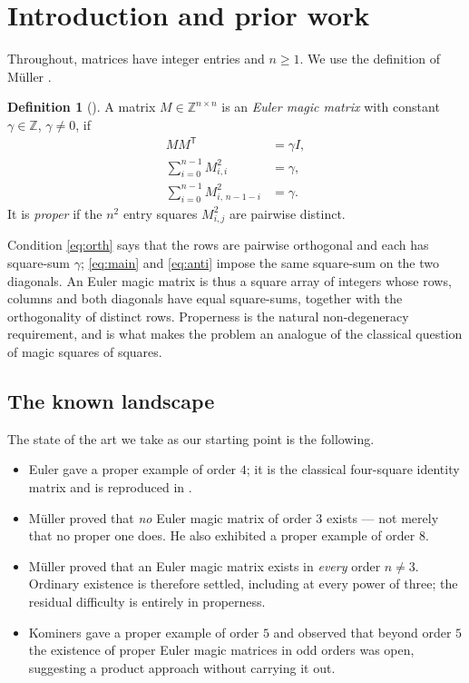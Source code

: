 \documentclass[11pt,a4paper]{amsart}
\theoremstyle{plain}
\theoremstyle{definition}
\newtheorem{definition}[theorem]{Definition}
\theoremstyle{remark}
\newcommand{\ZZ}{\mathbb{Z}}
\newcommand{\tr}{\mathsf{T}}
\begin{document}
\section{Introduction and prior work}

Throughout, matrices have integer entries and $n\ge1$. We use the definition of
Müller \cite{Muller2026}.

\begin{definition}[{\cite[Definition~1.1]{Muller2026}}]\label{def:euler}
A matrix $M\in\ZZ^{n\times n}$ is an \emph{Euler magic matrix} with constant
$\gamma\in\ZZ$, $\gamma\ne0$, if
\begin{align}
MM^{\tr} &= \gamma I, \label{eq:orth}\\
\sum_{i=0}^{n-1} M_{i,i}^{2} &= \gamma, \label{eq:main}\\
\sum_{i=0}^{n-1} M_{i,\,n-1-i}^{2} &= \gamma. \label{eq:anti}
\end{align}
It is \emph{proper} if the $n^2$ entry squares $M_{i,j}^2$ are pairwise
distinct.
\end{definition}

Condition \eqref{eq:orth} says that the rows are pairwise orthogonal and each
has square-sum $\gamma$; \eqref{eq:main} and \eqref{eq:anti} impose the same
square-sum on the two diagonals. An Euler magic matrix is thus a square array
of integers whose rows, columns and both diagonals have equal square-sums,
together with the orthogonality of distinct rows. Properness is the natural
non-degeneracy requirement, and is what makes the problem an analogue of the
classical question of magic squares of squares.

\subsection*{The known landscape}

The state of the art we take as our starting point is the following.

\begin{itemize}
\item Euler gave a proper example of order $4$; it is the classical
  four-square identity matrix and is reproduced in \cite[\S1]{Muller2026}.
\item Müller \cite[Theorem~1.2]{Muller2026} proved that \emph{no} Euler magic
  matrix of order $3$ exists --- not merely that no proper one does. He also
  exhibited a proper example of order $8$.
\item Müller \cite[Theorem~4.1]{Muller2026} proved that an Euler magic matrix
  exists in \emph{every} order $n\ne3$. Ordinary existence is therefore settled,
  including at every power of three; the residual difficulty is entirely in
  properness.
\item Kominers \cite{Kominers2026} gave a proper example of order $5$ and
  observed that beyond order $5$ the existence of proper Euler magic matrices
  in odd orders was open, suggesting a product approach without carrying it
  out.
\end{itemize}
\end{document}
